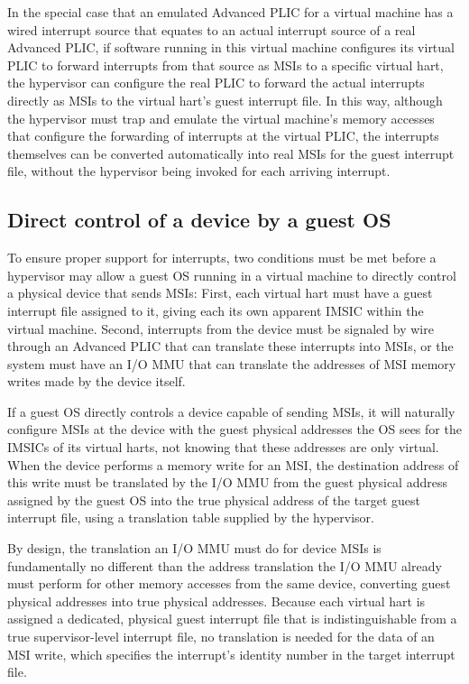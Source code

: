 In the special case that an emulated Advanced PLIC for a virtual
machine has a wired interrupt source that equates to an actual
interrupt source of a real Advanced PLIC, if software running in this
virtual machine configures its virtual PLIC to forward interrupts from
that source as MSIs to a specific virtual hart, the hypervisor can
configure the real PLIC to forward the actual interrupts directly as
MSIs to the virtual hart's guest interrupt file.
In this way, although the hypervisor must trap and emulate the virtual
machine's memory accesses that configure the forwarding of interrupts
at the virtual PLIC, the interrupts themselves can be converted
automatically into real MSIs for the guest interrupt file, without the
hypervisor being invoked for each arriving interrupt.

\subsection{Direct control of a device by a guest OS}

To ensure proper support for interrupts, two conditions must be met
before a hypervisor may allow a guest OS running in a virtual machine
to directly control a physical device that sends MSIs:
First, each virtual hart must have a guest interrupt file assigned to
it, giving each its own apparent IMSIC within the virtual machine.
Second, interrupts from the device must be signaled by wire through
an Advanced PLIC that can translate these interrupts into MSIs, or the
system must have an I/O MMU that can translate the addresses of MSI
memory writes made by the device itself.

If a guest OS directly controls a device capable of sending MSIs, it
will naturally configure MSIs at the device with the guest physical
addresses the OS sees for the IMSICs of its virtual harts, not knowing
that these addresses are only virtual.
When the device performs a memory write for an MSI, the destination
address of this write must be translated by the I/O MMU from the
guest physical address assigned by the guest OS into the true physical
address of the target guest interrupt file, using a translation table
supplied by the hypervisor.

By design, the translation an I/O MMU must do for device MSIs is
fundamentally no different than the address translation the I/O MMU
already must perform for other memory accesses from the same device,
converting guest physical addresses into true physical addresses.
Because each virtual hart is assigned a dedicated, physical guest
interrupt file that is indistinguishable from a true supervisor-level
interrupt file, no translation is needed for the data of an MSI write,
which specifies the interrupt's identity number in the target interrupt
file.


